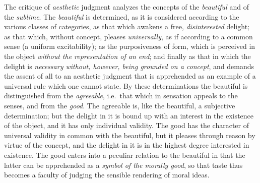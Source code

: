 The critique of \emph{aesthetic} judgment analyzes the concepts of the
\emph{beautiful} and of the \emph{sublime}. The \emph{beautiful} is
determined, as it is considered according to the various classes of
categories, as that which awakens a free, \emph{disinterested} delight;
as that which, without concept, pleases \emph{universally}, as if
according to a common sense (a uniform excitability); as the
purposiveness of form, which is perceived in the object \emph{without
the representation of an end}; and finally as that in which the delight
is \emph{necessary without, however, being grounded on a
concept}, and demands the assent of all to an aesthetic judgment that
is apprehended as an example of a universal rule which one cannot
state. By these determinations the beautiful is distinguished from the
\emph{agreeable}, i.e.\ that which in sensation appeals to the senses,
and from the \emph{good}. The agreeable is, like the beautiful, a
subjective determination; but the delight in it is bound up with an
interest in the existence of the object, and it has only individual
validity. The good has the character of universal validity in common
with the beautiful, but it pleases through reason by virtue of the
concept, and the delight in it is in the highest degree interested in
existence. The good enters into a peculiar relation to the beautiful
in that the latter can be apprehended as a \emph{symbol of the morally
good}, so that taste thus becomes a faculty of judging the sensible
rendering of moral ideas.

